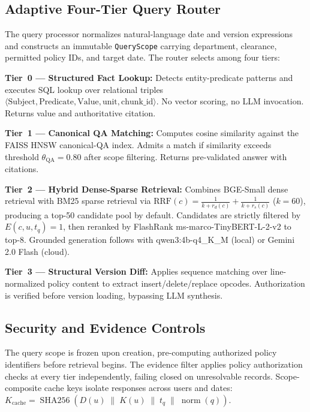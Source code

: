 \documentclass[journal]{IEEEtran}
\begin{document}
\subsection{Adaptive Four-Tier Query Router}
The query processor normalizes natural-language date and version expressions and constructs an immutable \texttt{QueryScope} carrying department, clearance, permitted policy IDs, and target date. The router selects among four tiers:

\textbf{Tier~0 --- Structured Fact Lookup:} Detects entity-predicate patterns and executes SQL lookup over relational triples $\langle\text{Subject},\text{Predicate},\text{Value},\text{unit},\text{chunk\_id}\rangle$. No vector scoring, no LLM invocation. Returns value and authoritative citation.

\textbf{Tier~1 --- Canonical QA Matching:} Computes cosine similarity against the FAISS HNSW canonical-QA index. Admits a match if similarity exceeds threshold $\theta_{\text{QA}}=0.80$ after scope filtering. Returns pre-validated answer with citations.

\textbf{Tier~2 --- Hybrid Dense-Sparse Retrieval:} Combines BGE-Small dense retrieval with BM25 sparse retrieval via $\text{RRF}(c)=\frac{1}{k+r_d(c)}+\frac{1}{k+r_s(c)}$ ($k=60$), producing a top-50 candidate pool by default. Candidates are strictly filtered by $E(c,u,t_q)=1$, then reranked by FlashRank ms-marco-TinyBERT-L-2-v2 to top-8. Grounded generation follows with qwen3:4b-q4\_K\_M (local) or Gemini 2.0 Flash (cloud).

\textbf{Tier~3 --- Structural Version Diff:} Applies sequence matching over line-normalized policy content to extract insert/delete/replace opcodes. Authorization is verified before version loading, bypassing LLM synthesis.

\subsection{Security and Evidence Controls}
The query scope is frozen upon creation, pre-computing authorized policy identifiers before retrieval begins. The evidence filter applies policy authorization checks at every tier independently, failing closed on unresolvable records. Scope-composite cache keys isolate responses across users and dates: $K_{\text{cache}}=\operatorname{SHA256}(D(u)\;\|\;K(u)\;\|\;t_q\;\|\;\operatorname{norm}(q))$.
\end{document}
